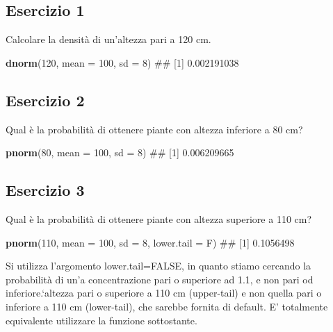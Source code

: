 \documentclass[a4paper,12pt,oneside]{book}
\newenvironment{Shaded}{\begin{snugshade}}{\end{snugshade}}
\newcommand{\KeywordTok}[1]{\textcolor[rgb]{0.13,0.29,0.53}{\textbf{#1}}}
\newcommand{\DataTypeTok}[1]{\textcolor[rgb]{0.13,0.29,0.53}{#1}}
\newcommand{\DecValTok}[1]{\textcolor[rgb]{0.00,0.00,0.81}{#1}}
\newcommand{\NormalTok}[1]{#1}
\theoremstyle{definition}
\theoremstyle{definition}
\theoremstyle{definition}
\theoremstyle{remark}
\begin{document}
\subsection{Esercizio 1}\label{esercizio-1}

Calcolare la densità di un'altezza pari a 120 cm.

\begin{Shaded}
\begin{Highlighting}[]
\KeywordTok{dnorm}\NormalTok{(}\DecValTok{120}\NormalTok{, }\DataTypeTok{mean =} \DecValTok{100}\NormalTok{, }\DataTypeTok{sd =} \DecValTok{8}\NormalTok{)}
\NormalTok{## [1] 0.002191038}
\end{Highlighting}
\end{Shaded}

\subsection{Esercizio 2}\label{esercizio-2}

Qual è la probabilità di ottenere piante con altezza inferiore a 80 cm?

\begin{Shaded}
\begin{Highlighting}[]
\KeywordTok{pnorm}\NormalTok{(}\DecValTok{80}\NormalTok{, }\DataTypeTok{mean =} \DecValTok{100}\NormalTok{, }\DataTypeTok{sd =} \DecValTok{8}\NormalTok{)}
\NormalTok{## [1] 0.006209665}
\end{Highlighting}
\end{Shaded}

\subsection{Esercizio 3}\label{esercizio-3}

Qual è la probabilità di ottenere piante con altezza superiore a 110 cm?

\begin{Shaded}
\begin{Highlighting}[]
\KeywordTok{pnorm}\NormalTok{(}\DecValTok{110}\NormalTok{, }\DataTypeTok{mean =} \DecValTok{100}\NormalTok{, }\DataTypeTok{sd =} \DecValTok{8}\NormalTok{, }\DataTypeTok{lower.tail =}\NormalTok{ F)}
\NormalTok{## [1] 0.1056498}
\end{Highlighting}
\end{Shaded}

Si utilizza l'argomento lower.tail=FALSE, in quanto stiamo cercando la
probabilità di un'a concentrazione pari o superiore ad 1.1, e non pari
od inferiore.`altezza pari o superiore a 110 cm (upper-tail) e non
quella pari o inferiore a 110 cm (lower-tail), che sarebbe fornita di
default. E' totalmente equivalente utilizzare la funzione sottostante.
\end{document}
